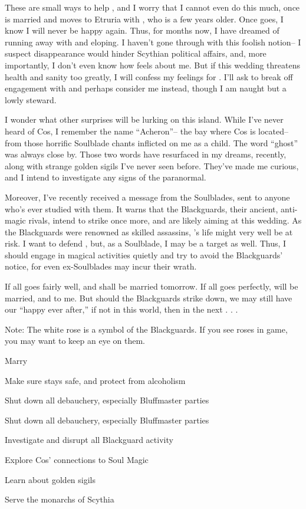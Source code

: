 \documentclass[char]{Kos}
\begin{document}
These are small ways to help \cBride{}, and I worry that I cannot even do this much, once \cBride{\they} is married and moves to Etruria with \cGroom{}, who is a few years older. Once \cBride{\they} goes, I know I will never be happy again. Thus, for months now, I have dreamed of running away with \cBride{} and eloping. I haven't gone through with this foolish notion-- I suspect \cBride{\their} disappearance would hinder Scythian political affairs, and, more importantly, I don't even know how \cBride{} feels about me. But if this wedding threatens \cBride{\their} health and sanity too greatly, I will confess my feelings for \cBride{\them}. I'll ask \cBride{\them} to break off \cBride{\their} engagement with \cGroom{} and perhaps consider me instead, though I am naught but a lowly steward. 

I wonder what other surprises will be lurking on this island. While I've never heard of Cos, I remember the name ``Acheron''-- the bay where Cos is located-- from those horrific Soulblade chants inflicted on me as a child. The word ``ghost'' was always close by. Those two words have resurfaced in my dreams, recently, along with strange golden sigils I've never seen before. They've made me curious, and I intend to investigate any signs of the paranormal.

Moreover, I've recently received a message from the Soulblades, sent to anyone who's ever studied with them. It warns that the Blackguards, their ancient, anti-magic rivals, intend to strike once more, and are likely aiming at this wedding. As the Blackguards were renowned as skilled assassins, \cBride{}'s life might very well be at risk. I want to defend \cBride{\them}, but, as a Soulblade, I may be a target as well. Thus, I should engage in magical activities quietly and try to avoid the Blackguards' notice, for even ex-Soulblades may incur their wrath.

If all goes fairly well, \cBride{} and \cGroom{} shall be married tomorrow. If all goes perfectly, \cBride{} will be married, and to me. But should the Blackguards strike \cBride{\them} down, we may still have our ``happy ever after,'' if not in this world, then in the next . . .

Note: The white rose is a symbol of the Blackguards. If you see roses in game, you may want to keep an eye on them.

\begin{itemz}[Goals]
 \item Marry \cBride{}
 \item Make sure \cBride{} stays safe, and protect \cBride{\them} from alcoholism
 \item Shut down all debauchery, especially Bluffmaster parties
 \item Shut down all debauchery, especially Bluffmaster parties
 \item Investigate and disrupt all Blackguard activity
 \item Explore Cos' connections to Soul Magic
 \item Learn about golden sigils
 \item Serve the monarchs of Scythia
\end{itemz}

\end{document}
